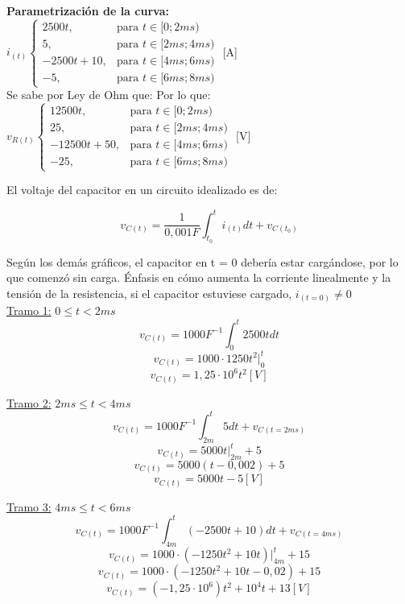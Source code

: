     \textbf{Parametrización de la curva:} \\[5pt]
    $
    i_{(t)}
    \begin{cases}
        2500t, & \text{para } t \in [0;2ms) \\
        5, & \text{para } t \in [2ms; 4ms) \\
        -2500t + 10, & \text{para } t \in [4ms; 6ms)  \\
        -5, & \text{para } t \in [6ms; 8ms)  
    \end{cases}
    $ [A] \\[5pt]
    Se sabe por Ley de Ohm que:
    Por lo que:\\
    $
    v_{R(t)}
    \begin{cases}
        12500t, & \text{para } t \in [0;2ms) \\
        25, & \text{para } t \in [2ms; 4ms) \\
        -12500t + 50, & \text{para } t \in [4ms; 6ms) \\
        -25, & \text{para } t \in [6ms; 8ms)
    \end{cases}
    $ [V] \\[5pt]

    \newpage
    

    El voltaje del capacitor en un circuito idealizado es de:

    \[ v_{C(t)} = \frac{1}{0,001F} \int_{t_0}^t i_{(t)}dt + v_{C(t_0)} \]

    Según los demás gráficos, el capacitor en t = 0 debería estar cargándose, por lo que comenzó sin carga. Énfasis en cómo aumenta la corriente linealmente y la tensión de la resistencia, si el capacitor estuviese cargado, $i_{(t=0)} \neq 0$ \\

    \underline{Tramo 1:} $0 \leq t < 2ms$
    \[ v_{C(t)} = 1000F^{-1} \int_{0}^t 2500tdt \]
    \[ v_{C(t)} = 1000\cdot1250t^2\rvert_0^t \]
    \[ v_{C(t)} = 1,25\cdot10^6 t^2 [V] \]

    \underline{Tramo 2:} $2ms \leq t < 4ms$
    \[ v_{C(t)} = 1000F^{-1} \int_{2m}^t  5   dt + v_{C(t=2ms)} \]
    \[ v_{C(t)} = 5000 t\rvert_{2m}^t + 5 \]
    \[ v_{C(t)} = 5000 (t - 0,002) + 5 \]
    \[ v_{C(t)} = 5000t - 5 [V]\]

    \underline{Tramo 3:} $4ms \leq t < 6ms$
    \[ v_{C(t)} = 1000F^{-1} \int_{4m}^t  (-2500t+10)   dt + v_{C(t=4ms)} \]
    \[ v_{C(t)} = 1000 \cdot (-1250t^2+10t)\rvert_{4m}^t + 15 \]
    \[ v_{C(t)} = 1000 \cdot (-1250t^2+10t-0,02) + 15 \]
    \[ v_{C(t)} = (-1,25\cdot10^6)t^2+10^4t+13 [V]\]
    
